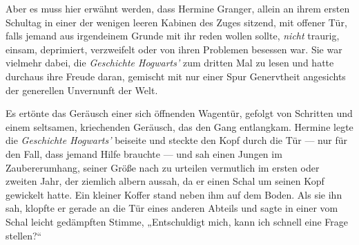 Aber es muss hier erwähnt werden, dass Hermine Granger, allein an ihrem ersten Schultag in einer der wenigen leeren Kabinen des Zuges sitzend, mit offener Tür, falls jemand aus irgendeinem Grunde mit ihr reden wollen sollte, \emph{nicht} traurig, einsam, deprimiert, verzweifelt oder von ihren Problemen besessen war. Sie war vielmehr dabei, die \emph{Geschichte Hogwarts’} zum dritten Mal zu lesen und hatte durchaus ihre Freude daran, gemischt mit nur einer Spur Genervtheit angesichts der generellen Unvernunft der Welt.

Es ertönte das Geräusch einer sich öffnenden Wagentür, gefolgt von Schritten und einem seltsamen, kriechenden Geräusch, das den Gang entlangkam. Hermine legte die \emph{Geschichte Hogwarts’} beiseite und steckte den Kopf durch die Tür — nur für den Fall, dass jemand Hilfe brauchte — und sah einen Jungen im Zaubererumhang, seiner Größe nach zu urteilen vermutlich im ersten oder zweiten Jahr, der ziemlich albern aussah, da er einen Schal um seinen Kopf gewickelt hatte. Ein kleiner Koffer stand neben ihm auf dem Boden. Als sie ihn sah, klopfte er gerade an die Tür eines anderen Abteils und sagte in einer vom Schal leicht gedämpften Stimme,
„Entschuldigt mich, kann ich schnell eine Frage stellen?“


